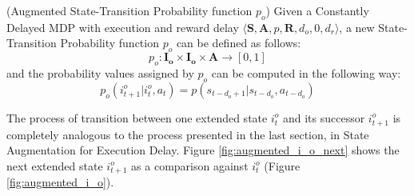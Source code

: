                 \begin{definition}(Augmented State-Transition Probability function $p_o$)
                    \label{def:obsaugmenttrans}
                    Given a Constantly Delayed MDP with execution and reward delay $\langle \mathbf{S}, \mathbf{A}, p, \mathbf{R}, d_o, 0, d_r \rangle$,
                    a new State-Transition Probability function $p_o$ can be defined as follows:
                    \[ p_o :  \mathbf{I_{o}} \times \mathbf{I_{o}} \times \mathbf{A} \rightarrow [0, 1]\]
                    and the probability values assigned by $p_o$ can be computed in the following way:
                    \[ p_o \left( i_{t+1}^o | i_t^o , a_t  \right) = p ( s_{t-d_{o}+1} | s_{t-d_{o}}, a_{t-d_{o}} ) \]
                \end{definition}                
                \noindent
                The process of transition between one extended state $i^o_t$ and its successor $i^o_{t+1}$ is completely analogous to the process presented in the last section, in State Augmentation for Execution Delay. Figure \ref{fig:augmented_i_o_next} shows the next extended state $i^o_{t+1}$ as a comparison against $i^o_t$ (Figure \ref{fig:augmented_i_o}).
                
